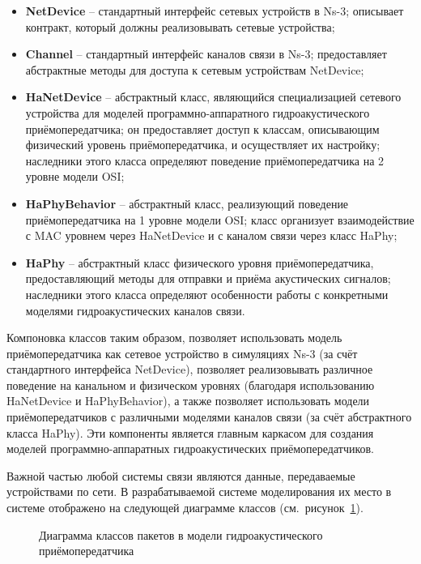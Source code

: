\documentclass[
    numbers=section,
    document-code={ВКРБ--09.03.04--10.19--XX--26--81}
]{../latex/fqw}
\begin{document}
    \begin{itemize}
        \item
        \textbf{NetDevice} -- стандартный интерфейс сетевых устройств в Ns-3;
        описывает контракт, который должны реализовывать сетевые устройства;
        \item
        \textbf{Channel} -- стандартный интерфейс каналов связи в Ns-3;
        предоставляет абстрактные методы для доступа к сетевым устройствам
        NetDevice;
        \item
        \textbf{HaNetDevice} -- абстрактный класс, являющийся специализацией сетевого устройства для
        моделей программно-аппаратного гидроакустического приёмопередатчика;
        он предоставляет доступ к классам, описывающим физический уровень приёмопередатчика, и
        осуществляет их настройку;
        наследники этого класса определяют поведение приёмопередатчика на 2 уровне модели OSI;
        \item
        \textbf{HaPhyBehavior} -- абстрактный класс, реализующий поведение приёмопередатчика на 1 уровне модели OSI;
        класс организует взаимодействие с MAC уровнем через HaNetDevice и с каналом связи через класс HaPhy;
        \item
        \textbf{HaPhy} -- абстрактный класс физического уровня приёмопередатчика,
        предоставляющий методы для отправки и приёма акустических сигналов;
        наследники этого класса определяют особенности работы с конкретными моделями гидроакустических каналов связи.
    \end{itemize}

    Компоновка классов таким образом, позволяет использовать модель приёмопередатчика как сетевое устройство в
    симуляциях Ns-3 (за счёт стандартного интерфейса NetDevice),
    позволяет реализовывать различное поведение на канальном и физическом уровнях
    (благодаря использованию HaNetDevice и HaPhyBehavior),
    а также позволяет использовать модели приёмопередатчиков с различными моделями каналов связи
    (за счёт абстрактного класса HaPhy).
    Эти компоненты является главным каркасом для создания моделей программно-аппаратных гидроакустических
    приёмопередатчиков.

    Важной частью любой системы связи являются данные, передаваемые устройствами по сети.
    В разрабатываемой системе моделирования их место в системе отображено на следующей диаграмме классов
    (см.~рисунок~\ref{fig:сlass_diagram_of_data_packets}).

    \begin{figure}[H]
        \centering
        \fbox{\rule{0pt}{20mm}\rule{40mm}{0pt}}
        \caption{Диаграмма классов пакетов в модели гидроакустического приёмопередатчика}
        \label{fig:сlass_diagram_of_data_packets}
    \end{figure}
\end{document}
